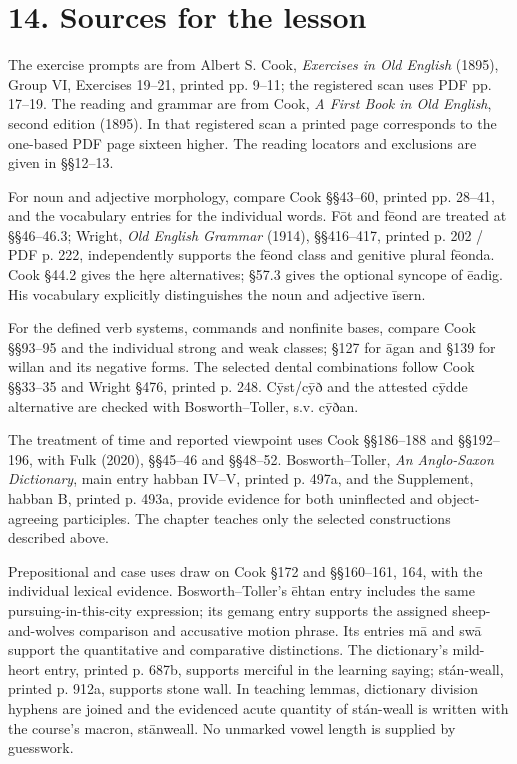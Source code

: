 \section*{14. Sources for the lesson}

The exercise prompts are from Albert S. Cook, \emph{Exercises in Old English} (1895), Group VI, Exercises 19–21, printed pp. 9–11; the registered scan uses PDF pp. 17–19. The reading and grammar are from Cook, \emph{A First Book in Old English}, second edition (1895). In that registered scan a printed page corresponds to the one-based PDF page sixteen higher. The reading locators and exclusions are given in §§12–13.

For noun and adjective morphology, compare Cook §§43–60, printed pp. 28–41, and the vocabulary entries for the individual words. Fōt and fēond are treated at §§46–46.3; Wright, \emph{Old English Grammar} (1914), §§416–417, printed p. 202 /\allowbreak{} PDF p. 222, independently supports the fēond class and genitive plural fēonda. Cook §44.2 gives the hęre alternatives; §57.3 gives the optional syncope of ēadig. His vocabulary explicitly distinguishes the noun and adjective īsern.

For the defined verb systems, commands and nonfinite bases, compare Cook §§93–95 and the individual strong and weak classes; §127 for āgan and §139 for willan and its negative forms. The selected dental combinations follow Cook §§33–35 and Wright §476, printed p. 248. Cȳst/\allowbreak{}cȳð and the attested cȳdde alternative are checked with Bosworth–Toller, s.v. cȳðan.

The treatment of time and reported viewpoint uses Cook §§186–188 and §§192–196, with Fulk (2020), §§45–46 and §§48–52. Bosworth–Toller, \emph{An Anglo-Saxon Dictionary}, main entry habban IV–V, printed p. 497a, and the Supplement, habban B, printed p. 493a, provide evidence for both uninflected and object-agreeing participles. The chapter teaches only the selected constructions described above.

Prepositional and case uses draw on Cook §172 and §§160–161, 164, with the individual lexical evidence. Bosworth–Toller’s ēhtan entry includes the same pursuing-in-this-city expression; its gemang entry supports the assigned sheep-and-wolves comparison and accusative motion phrase. Its entries mā and swā support the quantitative and comparative distinctions. The dictionary’s mild-heort entry, printed p. 687b, supports merciful in the learning saying; stán-weall, printed p. 912a, supports stone wall. In teaching lemmas, dictionary division hyphens are joined and the evidenced acute quantity of stán-weall is written with the course’s macron, stānweall. No unmarked vowel length is supplied by guesswork.

\endgroup

